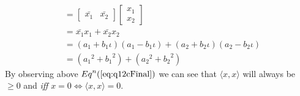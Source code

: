 \documentclass[a4paper]{article}
\begin{document}
\begin{qalist}
\begin{enumerate}[label=\alph*., align=left]
\begin{align}
					&= \begin{bmatrix}\bar{{x}_{1}} & \bar{{x}_{2}}\end{bmatrix}\begin{bmatrix}{x}_{1} \\ {x}_{2}\end{bmatrix}\\
					&= \bar{{x}_{1}}{x}_{1} + \bar{{x}_{2}}{x}_{2} \\
					&= ({a}_{1} + {b}_{1}\iota)({a}_{1} - {b}_{1}\iota) + ({a}_{2} + {b}_{2}\iota)({a}_{2} - {b}_{2}\iota) \\ 
					&= ({{a}_{1}}^{2} + {{b}_{1}}^{2}) + ({{a}_{2}}^{2} + {{b}_{2}}^{2}) \label{eq:q12cFinal}
				\end{align}
				By observing above  ${Eq}^{n}(\ref{eq:q12cFinal})$ we can see that $\langle x,x \rangle$ will always be $\geq 0$ and \textit{iff} $x = 0 \Leftrightarrow \langle x,x \rangle = 0$.
		\end{enumerate}
		

\end{qalist}
\end{document}
